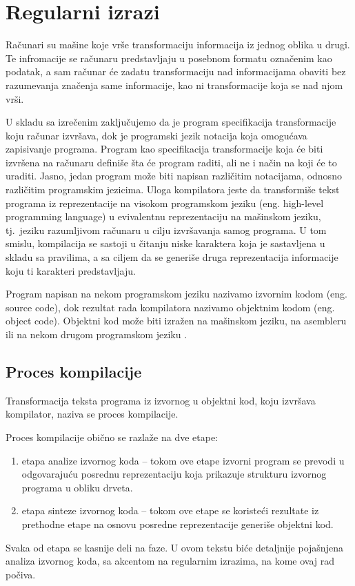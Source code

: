 \documentclass[12pt,oneside]{memoir}
\theoremstyle{plain}
\theoremstyle{definition}
\begin{document}
\chapter{Regularni izrazi}
Računari su mašine koje vrše transformaciju informacija iz jednog oblika u drugi. Te infromacije se računaru predstavljaju u posebnom formatu označenim  kao podatak, a sam računar će zadatu transformaciju nad informacijama obaviti bez razumevanja značenja same informacije, kao ni transformacije koja se nad njom vrši.

U skladu sa izrečenim zaključujemo da je program specifikacija transformacije koju računar izvršava, dok je programski jezik notacija koja omogućava zapisivanje programa. Program kao specifikacija transformacije koja će biti izvršena na računaru definiše šta će program raditi, ali ne i način na koji će to uraditi. Jasno, jedan program može biti napisan različitim notacijama, odnosno različitim programskim jezicima. Uloga kompilatora jeste da transformiše tekst programa iz reprezentacije na visokom programskom jeziku (eng. high-level programming language) u evivalentnu reprezentaciju na mašinskom jeziku, tj.~jeziku razumljivom računaru u cilju izvršavanja samog programa. U tom smislu, kompilacija se sastoji u čitanju niske karaktera koja je sastavljena u skladu sa pravilima, a sa ciljem da se generiše druga reprezentacija informacije koju ti karakteri predstavljaju.

Program napisan na nekom programskom jeziku nazivamo izvornim kodom  (eng. source code), dok rezultat rada kompilatora nazivamo objektnim kodom (eng. object code). Objektni kod može biti izražen na mašinskom jeziku, na asembleru ili na nekom drugom programskom jeziku \cite{Vitas}. 

\section{Proces kompilacije}
Transformacija teksta programa iz izvornog u objektni kod, koju izvršava kompilator, naziva se proces kompilacije.

Proces kompilacije obično se razlaže na dve etape:
\begin{enumerate}
\item etapa analize izvornog koda – tokom ove etape izvorni program se prevodi u odgovarajuću posrednu reprezentaciju koja prikazuje strukturu izvornog programa u obliku drveta.
\item etapa sinteze izvornog koda – tokom ove etape se koristeći rezultate iz prethodne etape na osnovu posredne reprezentacije generiše objektni kod.
\end{enumerate}
Svaka od etapa se kasnije deli na faze. U ovom tekstu biće detaljnije pojašnjena analiza izvornog koda, sa akcentom na regularnim izrazima, na kome ovaj rad počiva.
\end{document}
